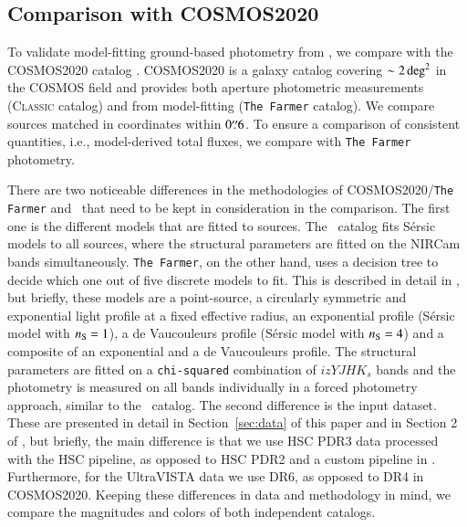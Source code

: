 \documentclass[longauth]{aa}
\begin{document}
\subsection{Comparison with COSMOS2020} \label{sec:C2020-compar}
To validate model-fitting ground-based photometry from \SEpp, we compare with the COSMOS2020 catalog \citep{weaver_cosmos2020_2022}. COSMOS2020 is a galaxy catalog covering $\sim 2 \, {\rm deg}^2$ in the COSMOS field and provides both aperture photometric measurements (\textsc{Classic} catalog) and from model-fitting (\texttt{The Farmer} catalog). We compare sources matched in coordinates within $0\overset{\prime\prime}{.}6$. To ensure a comparison of consistent quantities, i.e.,  model-derived total fluxes, we compare with \texttt{The Farmer} photometry. 

There are two noticeable differences in the methodologies of COSMOS2020/\texttt{The Farmer} and \SEpp\ that need to be kept in consideration in the comparison. The first one is the different models that are fitted to sources. The \SEpp\ catalog fits S\'ersic models to all sources, where the structural parameters are fitted on the NIRCam bands simultaneously. \texttt{The Farmer}, on the other hand, uses a decision tree to decide which one out of five discrete models to fit. This is described in detail in \cite{WeaverFarmer2023}, but briefly, these models are a point-source, a circularly symmetric and exponential light profile at a fixed effective radius, an exponential profile (S\'ersic model with $n_{\rm S}=1$), a de Vaucouleurs profile (S\'ersic model with $n_{\rm S}=4$) and a composite of an exponential and a de Vaucouleurs profile. The structural parameters are fitted on a \texttt{chi-squared} combination of $izYJHK_{s}$ bands and the photometry is measured on all bands individually in a forced photometry approach, similar to the \SEpp\ catalog. The second difference is the input dataset. These are presented in detail in Section~\ref{sec:data} of this paper and in Section 2 of \cite{weaver_cosmos2020_2022}, but briefly, the main difference is that we use HSC PDR3 data processed with the HSC pipeline, as opposed to HSC PDR2 and a custom pipeline in \cite{weaver_cosmos2020_2022}. Furthermore, for the UltraVISTA data we use DR6, as opposed to DR4 in COSMOS2020. Keeping these differences in data and methodology in mind, we compare the magnitudes and colors of both independent catalogs.
\end{document}
